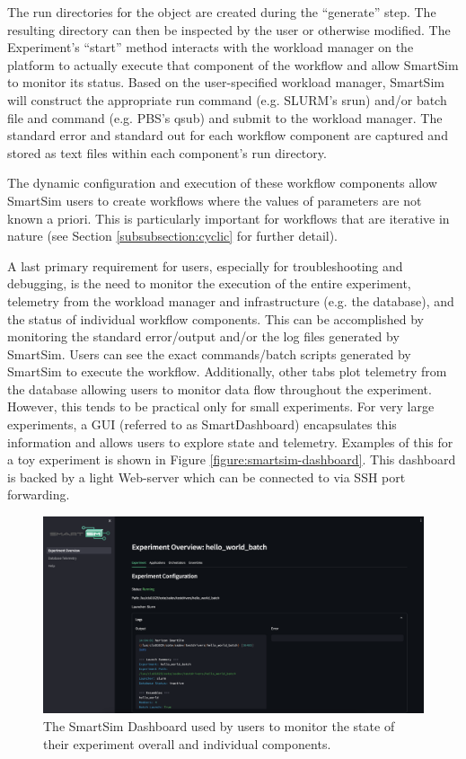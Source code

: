 \documentclass[utf8]{FrontiersinVancouver} %
\begin{document}
The run directories for the object are created during the ``generate'' step. The resulting directory can then be inspected by the user or otherwise modified. The Experiment's ``start'' method interacts with the workload manager on the platform to actually execute that component of the workflow and allow SmartSim to monitor its status. Based on the user-specified workload manager, SmartSim will construct the appropriate run command (e.g. SLURM's srun) and/or batch file and command (e.g. PBS's qsub) and submit to the workload manager. The standard error and standard out for each workflow component are captured and stored as text files within each component's run directory.

The dynamic configuration and execution of these workflow components allow SmartSim users to create workflows where the values of parameters are not known a priori. This is particularly important for workflows that are iterative in nature (see Section \ref{subsubsection:cyclic} for further detail).

A last primary requirement for users, especially for troubleshooting and debugging, is the need to monitor the execution of the entire experiment, telemetry from the workload manager and infrastructure (e.g. the database), and the status of individual workflow components. This can be accomplished by monitoring the standard error/output and/or the log files generated by SmartSim. Users can see the exact commands/batch scripts generated by SmartSim to execute the workflow. Additionally, other tabs plot telemetry from the database allowing users to monitor data flow throughout the experiment. However, this tends to be practical only for small experiments. For very large experiments, a GUI (referred to as SmartDashboard) encapsulates this information and allows users to explore state and telemetry. Examples of this for a toy experiment is shown in Figure \ref{figure:smartsim-dashboard}. This dashboard is backed by a light Web-server which can be connected to via SSH port forwarding. 

\begin{figure}[htb]\label{figure:smartdashboard}
    \centering\includegraphics[width=0.8\columnwidth]{images/smartdashboard_experiment.png}
    \caption{The SmartSim Dashboard used by users to monitor the state of their experiment overall and individual components.}
    \label{fig:smartsim-dashboard}
\end{figure}
\end{document}
